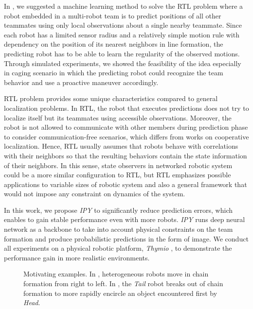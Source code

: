 \documentclass[letterpaper, 10 pt, conference]{ieeeconf}  %
\begin{document}
	In \cite{Choi17}, we suggested a machine learning method to solve the 
	RTL problem where a robot embedded in a multi-robot team is to predict 
	positions of all other teammates using only local observations about a single nearby teammate. 
	Since each robot has a limited sensor radius and a relatively simple motion rule with dependency 
	on the position of its nearest neighbors in line formation, 
	the predicting robot has to be able to learn the regularity 
	of the observed motions. Through simulated experiments, we showed the feasibility of the idea 
	especially in caging scenario in which the predicting robot could recognize the team behavior and 
	use a proactive maneuver accordingly. 
	
	RTL problem provides some unique characteristics compared to general localization problems. 
	In RTL, the robot that executes predictions does not try to localize itself but its teammates using 
	accessible observations. 
	Moreover, the robot is not allowed to communicate with other members during prediction phase to 
	consider communication-free scenarios, which differs from works on cooperative localization. 
	Hence, RTL usually assumes that robots behave with correlations with their neighbors so that 
	the resulting behaviors contain the state information of their neighbors. 	
	In this sense, state observers in networked robotic system could be a more similar 
	configuration to RTL, but RTL emphasizes 
	possible applications to variable sizes of robotic system and also a general framework 
	that would not impose any constraint on dynamics of the system.
	
	In this work, we propose \emph{IPY} to significantly reduce prediction errors, which enables to 
	gain stable performance even with more robots. \emph{IPY} runs deep neural network as a backbone 
	to take into account physical constraints on the team formation and produce probabilistic 
	predictions in the form of image. We conduct all experiments on a physical robotic platform,
	\emph{Thymio} \cite{Shin14}, to demonstrate the performance gain in more realistic environments. 
	
	
		
	\begin{figure}\centering
		\caption{Motivating examples.
			In \protect{}, heterogeneous robots move in
			chain formation from right to left. In
			\protect{}, the \emph{Tail} robot breaks
			out of chain formation to more rapidly encircle an object
			encountered first by \emph{Head}.
		}
		\label{fig:SampleChains}
	\end{figure}
	
\end{document}
